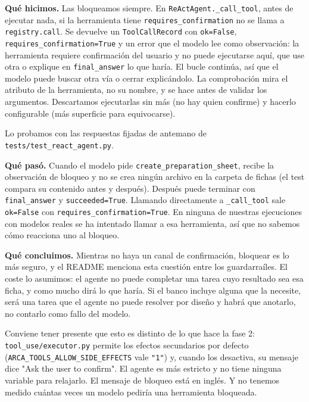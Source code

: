 \textbf{Qué hicimos.} Las bloqueamos siempre. En \texttt{ReActAgent.\_\allowbreak{}call\_\allowbreak{}tool}, antes de ejecutar nada, si la
herramienta tiene \texttt{requires\_\allowbreak{}confirmation} no se llama a \texttt{registry.call}. Se devuelve un
\texttt{ToolCallRecord} con \texttt{ok=\allowbreak{}False}, \texttt{requires\_\allowbreak{}confirmation=\allowbreak{}True} y un error que el modelo lee como
observación: la herramienta requiere confirmación del usuario y no puede ejecutarse aquí, que use otra
o explique en \texttt{final\_\allowbreak{}answer} lo que haría. El bucle continúa, así que el modelo puede buscar otra vía
o cerrar explicándolo. La comprobación mira el atributo de la herramienta, no su nombre, y se hace antes
de validar los argumentos. Descartamos ejecutarlas sin más (no hay quien confirme) y hacerlo
configurable (más superficie para equivocarse).

Lo probamos con las respuestas fijadas de antemano de \texttt{tests/\allowbreak{}test\_\allowbreak{}react\_\allowbreak{}agent.py}.

\textbf{Qué pasó.} Cuando el modelo pide \texttt{create\_\allowbreak{}preparation\_\allowbreak{}sheet}, recibe la observación de bloqueo y no
se crea ningún archivo en la carpeta de fichas (el test compara su contenido antes y después).
Después puede terminar con \texttt{final\_\allowbreak{}answer} y \texttt{succeeded=\allowbreak{}True}. Llamando directamente a \texttt{\_\allowbreak{}call\_\allowbreak{}tool}
sale \texttt{ok=\allowbreak{}False} con \texttt{requires\_\allowbreak{}confirmation=\allowbreak{}True}. En ninguna de nuestras ejecuciones con modelos
reales se ha intentado llamar a esa herramienta, así que no sabemos cómo reacciona uno al bloqueo.

\textbf{Qué concluimos.} Mientras no haya un canal de confirmación, bloquear es lo más seguro, y el README
menciona esta cuestión entre los guardarraíles. El coste lo asumimos: el agente no puede completar
una tarea cuyo resultado sea esa ficha, y como mucho dirá lo que haría. Si el banco incluye alguna que
la necesite, será una tarea que el agente no puede resolver por diseño y habrá que anotarlo, no
contarlo como fallo del modelo.

Conviene tener presente que esto es distinto de lo que hace la fase 2: \texttt{tool\_\allowbreak{}use/\allowbreak{}executor.py} permite los
efectos secundarios por defecto (\texttt{ARCA\_\allowbreak{}TOOLS\_\allowbreak{}ALLOW\_\allowbreak{}SIDE\_\allowbreak{}EFFECTS} vale \texttt{"1"}) y, cuando los desactiva,
su mensaje dice "Ask the user to confirm". El agente es más estricto y no tiene ninguna variable para
relajarlo. El mensaje de bloqueo está en inglés. Y no tenemos medido cuántas veces un modelo pediría
una herramienta bloqueada.

